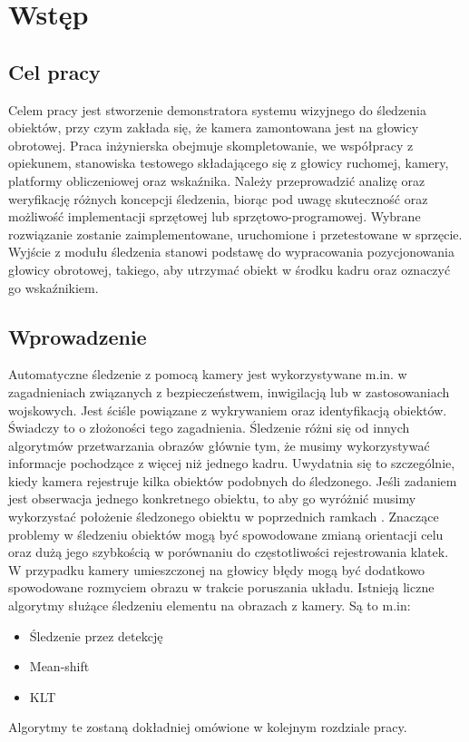 \chapter{Wstęp}
\label{cha:wstep}

\section{Cel pracy}
\label{sec:celpracy}

Celem pracy jest stworzenie demonstratora systemu wizyjnego do śledzenia obiektów, przy czym zakłada się, że kamera zamontowana jest na głowicy obrotowej. Praca inżynierska obejmuje skompletowanie, we współpracy z opiekunem, stanowiska testowego składającego się z głowicy ruchomej, kamery, platformy obliczeniowej oraz wskaźnika. Należy przeprowadzić analizę oraz weryfikację różnych koncepcji śledzenia, biorąc pod uwagę skuteczność oraz możliwość implementacji sprzętowej lub sprzętowo-programowej. Wybrane rozwiązanie zostanie zaimplementowane, uruchomione i przetestowane w sprzęcie. Wyjście z modułu śledzenia stanowi podstawę do wypracowania pozycjonowania głowicy obrotowej, takiego, aby utrzymać obiekt w środku kadru oraz oznaczyć go wskaźnikiem.

\section{Wprowadzenie}
\label{sec:wprowadzenie}

Automatyczne śledzenie z pomocą kamery jest wykorzystywane m.in. w zagadnieniach związanych z bezpieczeństwem, inwigilacją lub w zastosowaniach wojskowych. Jest ściśle powiązane z wykrywaniem oraz identyfikacją obiektów. Świadczy to o złożoności tego zagadnienia. Śledzenie różni się od innych algorytmów przetwarzania obrazów głównie tym, że musimy wykorzystywać informacje pochodzące z więcej niż jednego kadru. Uwydatnia się to szczególnie, kiedy kamera rejestruje kilka obiektów podobnych do śledzonego. Jeśli zadaniem jest obserwacja jednego konkretnego obiektu, to aby go wyróżnić musimy wykorzystać położenie śledzonego obiektu w poprzednich ramkach \cite{VT}. Znaczące problemy w śledzeniu obiektów mogą być spowodowane zmianą orientacji celu oraz dużą jego szybkością w porównaniu do częstotliwości rejestrowania klatek. W przypadku kamery umieszczonej na głowicy błędy mogą być dodatkowo spowodowane rozmyciem obrazu w trakcie poruszania układu. Istnieją liczne algorytmy służące śledzeniu elementu na obrazach z kamery. Są to m.in:
\begin{itemize}
\item{Śledzenie przez detekcję}
\item{Mean-shift}
\item{KLT}
\end{itemize}
Algorytmy te zostaną dokładniej omówione w kolejnym rozdziale pracy.

